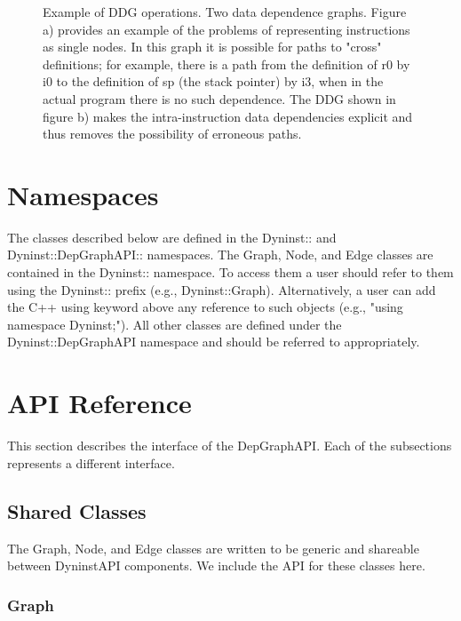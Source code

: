 \documentclass[12pt]{article}
\begin{document}
\begin{figure}\label{Operations}
\begin{center}
\caption{Example of DDG operations.  Two data dependence
graphs. Figure a) provides an example of the problems of representing
instructions as single nodes. In this graph it is possible for paths
to "cross" definitions; for example, there is a path from the
definition of r0 by i0 to the definition of sp (the stack pointer) by
i3, when in the actual program there is no such dependence. The DDG
shown in figure b) makes the intra-instruction data dependencies
explicit and thus removes the possibility of erroneous paths.}
\end{center}
\end{figure}

\section{Namespaces}

The classes described below are defined in the Dyninst:: and
Dyninst::DepGraphAPI:: namespaces. The Graph, Node, and Edge classes
are contained in the Dyninst:: namespace.  To access them a user
should refer to them using the Dyninst:: prefix (e.g.,
Dyninst::Graph). Alternatively, a user can add the C++ using keyword
above any reference to such objects (e.g., "using namespace
Dyninst;"). All other classes are defined under the
Dyninst::DepGraphAPI namespace and should be referred to
appropriately.

\section{API Reference}

This section describes the interface of the DepGraphAPI. Each of the
subsections represents a different interface.
        
\subsection{Shared Classes}

The Graph, Node, and Edge classes are written to be generic and
shareable between DyninstAPI components. We include the API for these
classes here.

\subsubsection{Graph}
\end{document}
